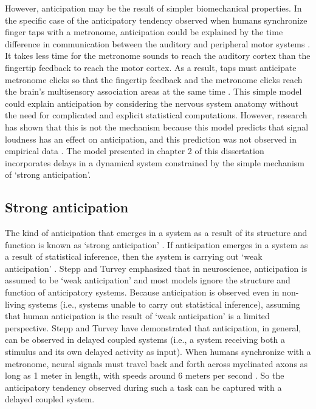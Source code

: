 \documentclass{report}
\begin{document}
However, anticipation may be the result of simpler biomechanical properties. In the specific case of the anticipatory tendency observed when humans synchronize finger taps with a metronome, anticipation could be explained by the time difference in communication between the auditory and peripheral motor systems \cite{aschersleben2002temporal}. It takes less time for the metronome sounds to reach the auditory cortex than the fingertip feedback to reach the motor cortex. As a result, taps must anticipate metronome clicks so that the fingertip feedback and the metronome clicks reach the brain's multisensory association areas at the same time \cite{aschersleben2002temporal}. This simple model could explain anticipation by considering the nervous system anatomy without the need for complicated and explicit statistical computations. However, research has shown that this is not the mechanism because this model predicts that signal loudness has an effect on anticipation, and this prediction was not observed in empirical data \cite{bialunska2011increasing}. The model presented in chapter 2 of this dissertation incorporates delays in a dynamical system constrained by the simple mechanism of `strong anticipation'. 

\subsection{Strong anticipation}
The kind of anticipation that emerges in a system as a result of its structure and function is known as `strong anticipation' \cite{dubois2001incursive}. If anticipation emerges in a system as a result of statistical inference, then the system is carrying out `weak anticipation' \cite{dubois2001incursive}. Stepp and Turvey \cite{stepp2010strong} emphasized that in neuroscience, anticipation is assumed to be `weak anticipation' and most models ignore the structure and function of anticipatory systems. Because anticipation is observed even in non-living systems (i.e., systems unable to carry out statistical inference), assuming that human anticipation is the result of `weak anticipation' is a limited perspective. Stepp and Turvey \cite{stepp2010strong} have demonstrated that anticipation, in general, can be observed in delayed coupled systems (i.e., a system receiving both a stimulus and its own delayed activity as input). When humans synchronize with a metronome, neural signals must travel back and forth across myelinated axons as long as 1 meter in length, with speeds around 6 meters per second \cite{swadlow2012axonal}. So the anticipatory tendency observed during such a task can be captured with a delayed coupled system.
\end{document}
